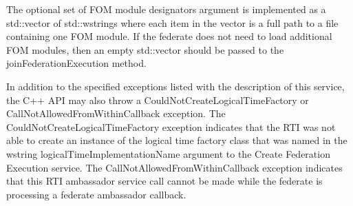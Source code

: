 \begin{compactstdpage}
    The optional set of FOM module designators argument is implemented as a std::vector of std::wstrings where each item in the vector is a full path to a file containing one FOM module. If the federate does not need to load additional FOM modules, then an empty std::vector should be passed to the joinFederationExecution method.

    In addition to the specified exceptions listed with the description of this service, the C++ API may also throw a CouldNotCreateLogicalTimeFactory or CallNotAllowedFromWithinCallback exception. The CouldNotCreateLogicalTimeFactory exception indicates that the RTI was not able to create an instance of the logical time factory class that was named in the wstring logicalTimeImplementationName argument to the Create Federation Execution service. The CallNotAllowedFromWithinCallback exception indicates that this RTI ambassador service call cannot be made while the federate is processing a federate ambassador callback.

\end{compactstdpage}

\clearpage

